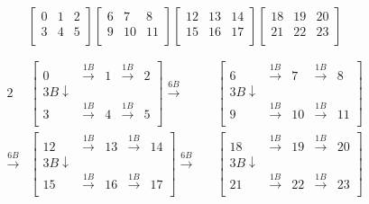\documentclass[oneside, 12pt]{report}
\begin{document}
\begin{equation*}
\begin{bmatrix}
0 & 1 & 2 \\
3 & 4 & 5 \\
\end{bmatrix}
\begin{bmatrix}
6 & 7 & 8 \\
9 & 10 & 11 \\
\end{bmatrix}
\begin{bmatrix}
12 & 13 & 14 \\
15 & 16 & 17 \\
\end{bmatrix}
\begin{bmatrix}
18 & 19 & 20 \\
21 & 22 & 23 \\
\end{bmatrix}
\end{equation*}

\begin{figure}[H]
\begin{alignat*}{2}
&\begin{bmatrix}
0 & \xrightarrow{1B} & 1 &\xrightarrow{1B} & 2 \\
3B \downarrow \\
3 & \xrightarrow{1B} & 4 &\xrightarrow{1B} & 5 \\
\end{bmatrix}
\xrightarrow{6B} 
&&\begin{bmatrix}
6 & \xrightarrow{1B} & 7 &\xrightarrow{1B} & 8 \\
3B \downarrow \\
9 & \xrightarrow{1B} & 10 &\xrightarrow{1B} & 11 \\
\end{bmatrix}\\
\xrightarrow{6B} 
&\begin{bmatrix}
12 & \xrightarrow{1B} & 13 &\xrightarrow{1B} & 14 \\
3B \downarrow \\
15 & \xrightarrow{1B} & 16 &\xrightarrow{1B} & 17 \\
\end{bmatrix} 
\xrightarrow{6B} 
&&\begin{bmatrix}
18 & \xrightarrow{1B} & 19 &\xrightarrow{1B} & 20 \\
3B \downarrow \\
21 & \xrightarrow{1B} & 22 &\xrightarrow{1B} & 23 \\
\end{bmatrix}
\end{alignat*}
\end{figure}
\end{document}
